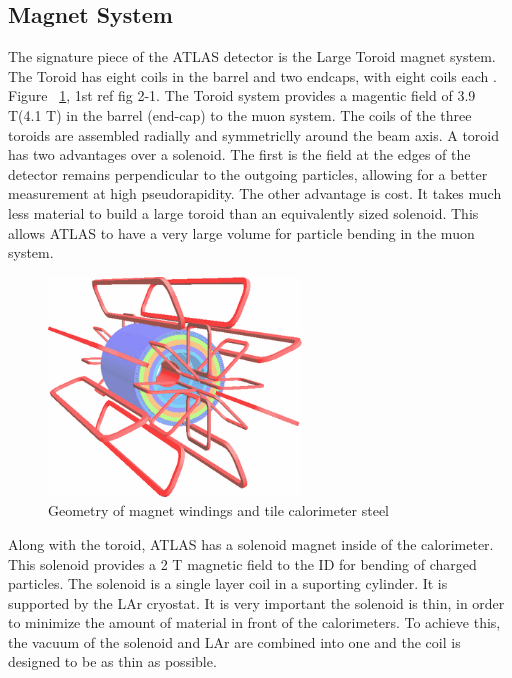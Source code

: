 \subsection{Magnet System}\label{ssec:mag}
The signature piece of the ATLAS detector is the Large Toroid magnet system. The Toroid has eight coils in the barrel and two endcaps, with eight coils each \cite{CERN-LHCC-97-018}. Figure ~\ref{fig:toroid}, 1st ref fig 2-1. The Toroid system provides a magentic field of 3.9 T(4.1 T) in the barrel (end-cap) to the muon system. The coils of the three toroids are assembled radially and symmetriclly around the beam axis. A toroid has two advantages over a solenoid. The first is the field at the edges of the detector remains perpendicular to the outgoing particles, allowing for a better measurement at high pseudorapidity. The other advantage is cost. It takes much less material to build a large toroid than an equivalently sized solenoid. This allows ATLAS to have a very large volume for particle bending in the muon system.\linebreak

\begin{figure}[h]
\begin{center}
\includegraphics*[width=0.60\textwidth] {figures/toroid}%
\caption[Geometry of magnet windings and tile calorimeter steel]{Geometry of magnet windings and tile calorimeter steel \cite{Love:2011qua}}
\label{fig:toroid}
\end{center}
\end{figure}

\indent Along with the toroid, ATLAS has a solenoid magnet inside of the calorimeter. This solenoid  provides a 2 T magnetic field to the ID for bending of charged particles. The solenoid is a single layer coil in a suporting cylinder. It is supported by the LAr cryostat. It is very important the solenoid is thin, in order to minimize the amount of material in front of the calorimeters. To achieve this, the vacuum of the solenoid and LAr are combined into one and the coil is designed to be as thin as possible.
